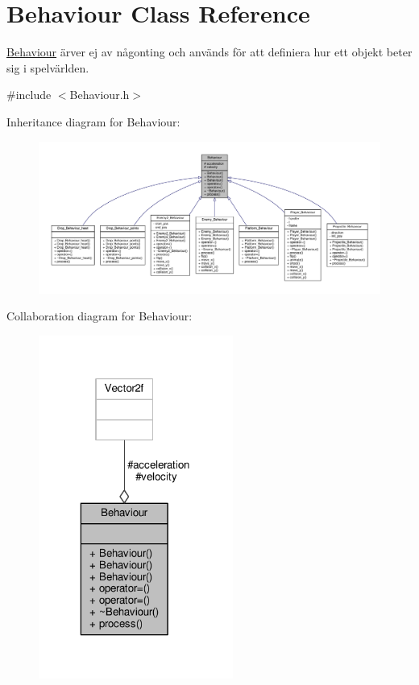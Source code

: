 \hypertarget{classBehaviour}{\section{Behaviour Class Reference}
\label{classBehaviour}
}


\hyperlink{classBehaviour}{Behaviour} ärver ej av någonting och används för att definiera hur ett objekt beter sig i spelvärlden.  




{\ttfamily \#include $<$Behaviour.\+h$>$}



Inheritance diagram for Behaviour\+:\nopagebreak
\begin{figure}[H]
\begin{center}
\leavevmode
\includegraphics[width=350pt]{classBehaviour__inherit__graph}
\end{center}
\end{figure}


Collaboration diagram for Behaviour\+:\nopagebreak
\begin{figure}[H]
\begin{center}
\leavevmode
\includegraphics[width=181pt]{classBehaviour__coll__graph}
\end{center}
\end{figure}
